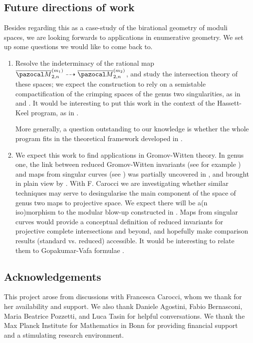 \documentclass[11pt]{amsart}
\newcommand{\oM}{\overline{\pazocal M}}
\theoremstyle{plain}
\theoremstyle{definition}
\begin{document}
\subsection{Future directions of work} Besides regarding this as a case-study of the birational geometry of moduli spaces, we are looking forwards to applications in enumerative geometry. We set up some questions we would like to come back to.
\begin{enumerate}[leftmargin=.7cm]
 \item Resolve the indeterminacy of the rational map $\oM_{2,n}^{(m_1)}\dashrightarrow\oM_{2,n}^{(m_2)}$, and study the intersection theory of these spaces; we expect the construction to rely on a semistable compactification of the crimping spaces of the genus two singularities, as in \cite[\S 1.10]{vdW} and \cite{SMY3}. It would be interesting to put this work in the context of the Hassett-Keel program, as in \cite{SMY2}.
 
 More generally, a question outstanding to our knowledge is whether the whole program fits in the theoretical framework developed in \cite{DHLinstability}.
 
 \item We expect this work to find applications in Gromov-Witten theory. In genus one, the link between reduced Gromov-Witten invariants (see for example \cite{VZ,Zingerred,LZ}) and maps from singular curves (see \cite{VISC}) was partially uncovered in \cite{BCM}, and brought in plain view by \cite{RSPW1,RSPW2}. With F. Carocci we are investigating whether similar techniques may serve to desingularise the main component of the space of genus two maps to projective space. We expect there will be a(n iso)morphism to the modular blow-up constructed in \cite{HLN}. Maps from singular curves would provide a conceptual definition of reduced invariants for projective complete intersections and beyond, and hopefully make comparison results (standard vs. reduced) accessible. It would be interesting to relate them to Gopakumar-Vafa formulae \cite{Pandha}.
\end{enumerate}

\subsection{Acknowledgements} This project arose from discussions with Francesca Carocci, whom we thank for her availability and support. We also thank Daniele Agostini, Fabio Bernasconi, Maria Beatrice Pozzetti, and Luca Tasin for helpful conversations. We thank the Max Planck Institute for Mathematics in Bonn for providing financial support and a stimulating research environment.
\end{document}
